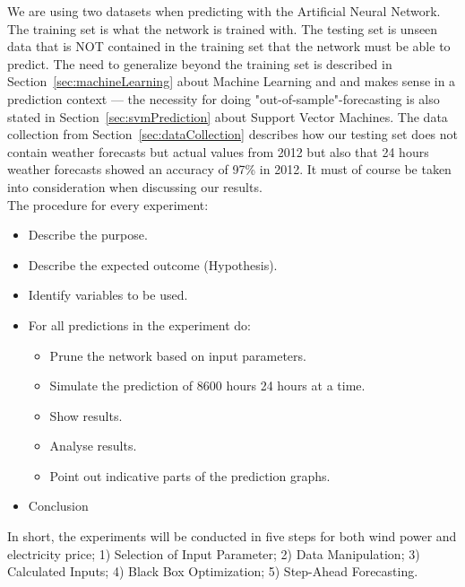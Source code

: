 We are using two datasets when predicting with the Artificial Neural Network. The training set is what the network is trained with. The testing set is unseen data that is NOT contained in the training set that the network must be able to predict. The need to generalize beyond the training set is described in Section~\ref{sec:machineLearning} about Machine Learning and and makes sense in a prediction context --- the necessity for doing "out-of-sample"-forecasting is also stated in Section~\ref{sec:svmPrediction} about Support Vector Machines. The data collection from Section~\ref{sec:dataCollection} describes how our testing set does not contain weather forecasts but actual values from 2012 but also that 24 hours weather forecasts showed an accuracy of 97\% in 2012. It must of course be taken into consideration when discussing our results.
\\[0.5cm]
The procedure for every experiment:
\begin{itemize}
\item Describe the purpose.
\item Describe the expected outcome (Hypothesis).
\item Identify variables to be used.
\item For all predictions in the experiment do:
\begin{itemize}
	\item Prune the network based on input parameters.
	\item Simulate the prediction of 8600 hours 24 hours at a time.
	\item Show results.
	\item Analyse results.
	\item Point out indicative parts of the prediction graphs.
\end{itemize}
\item Conclusion
\end{itemize}
\noindent In short, the experiments will be conducted in five steps for both wind power and electricity price; 1) Selection of Input Parameter; 2) Data Manipulation; 3) Calculated Inputs; 4) Black Box Optimization; 5) Step-Ahead Forecasting.
\newpage